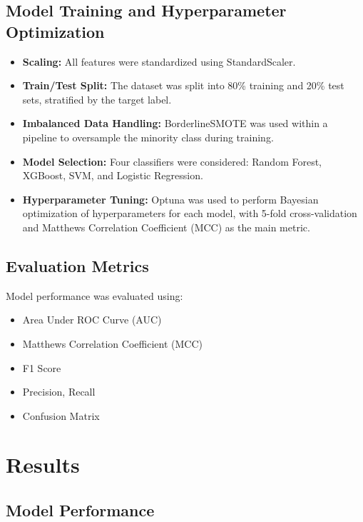 \documentclass[11pt,a4paper]{article}
\begin{document}
\subsection{Model Training and Hyperparameter Optimization}
\begin{itemize}
    \item \textbf{Scaling:} All features were standardized using StandardScaler.
    \item \textbf{Train/Test Split:} The dataset was split into 80\% training and 20\% test sets, stratified by the target label.
    \item \textbf{Imbalanced Data Handling:} BorderlineSMOTE was used within a pipeline to oversample the minority class during training.
    \item \textbf{Model Selection:} Four classifiers were considered: Random Forest, XGBoost, SVM, and Logistic Regression.
    \item \textbf{Hyperparameter Tuning:} Optuna was used to perform Bayesian optimization of hyperparameters for each model, with 5-fold cross-validation and Matthews Correlation Coefficient (MCC) as the main metric.
\end{itemize}

\subsection{Evaluation Metrics}
Model performance was evaluated using:
\begin{itemize}
    \item Area Under ROC Curve (AUC)
    \item Matthews Correlation Coefficient (MCC)
    \item F1 Score
    \item Precision, Recall
    \item Confusion Matrix
\end{itemize}

\section{Results}

\subsection{Model Performance}
\end{document}
